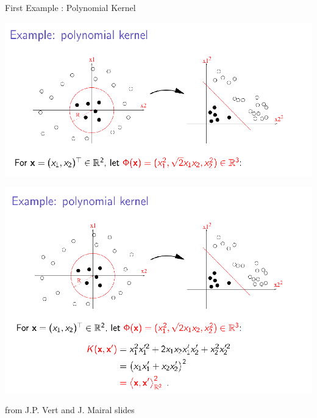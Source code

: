 \documentclass[10pt]{beamer}
\begin{document}
\begin{frame}{First Example : Polynomial Kernel}
    \begin{overprint}
    \begin{center} 
        \includegraphics[width=.99\linewidth]{JPV_slide19.png}
    \end{center}
    
    \begin{center} 
        \includegraphics[width=.99\linewidth]{JPV_slide19b.png}
    \end{center}
    \end{overprint}
    from J.P. Vert and J. Mairal slides
\end{frame}
\end{document}
